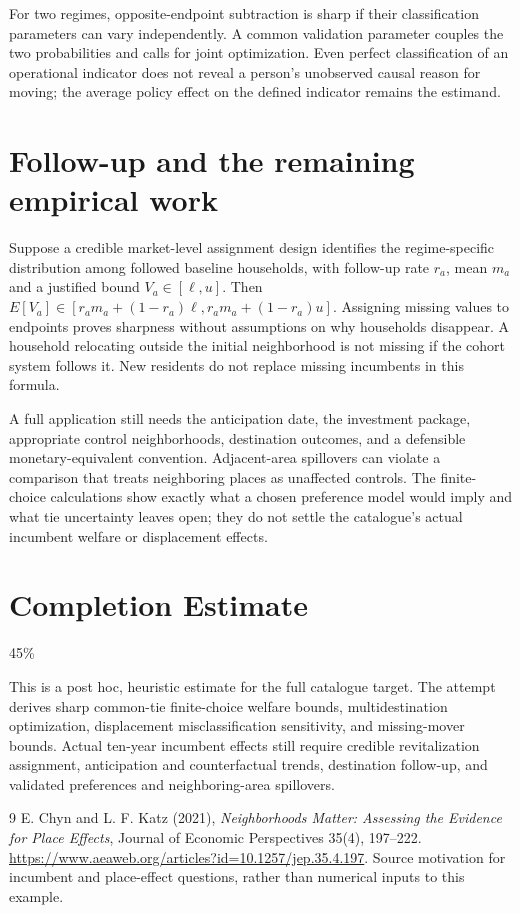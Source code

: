\documentclass[11pt,a4paper]{article}
\begin{document}
For two regimes, opposite-endpoint subtraction is sharp if their classification parameters can vary independently. A common validation parameter couples the two probabilities and calls for joint optimization. Even perfect classification of an operational indicator does not reveal a person's unobserved causal reason for moving; the average policy effect on the defined indicator remains the estimand.

\section{Follow-up and the remaining empirical work}
Suppose a credible market-level assignment design identifies the regime-specific distribution among followed baseline households, with follow-up rate $r_a$, mean $m_a$ and a justified bound $V_a\in[\ell,u]$. Then
$E[V_a]\in[r_am_a+(1-r_a)\ell,r_am_a+(1-r_a)u]$. Assigning missing values to endpoints proves sharpness without assumptions on why households disappear. A household relocating outside the initial neighborhood is not missing if the cohort system follows it. New residents do not replace missing incumbents in this formula.

A full application still needs the anticipation date, the investment package, appropriate control neighborhoods, destination outcomes, and a defensible monetary-equivalent convention. Adjacent-area spillovers can violate a comparison that treats neighboring places as unaffected controls. The finite-choice calculations show exactly what a chosen preference model would imply and what tie uncertainty leaves open; they do not settle the catalogue's actual incumbent welfare or displacement effects.

\section{Completion Estimate}
45\%

This is a post hoc, heuristic estimate for the full catalogue target.
The attempt derives sharp common-tie finite-choice welfare bounds, multidestination optimization, displacement misclassification sensitivity, and missing-mover bounds. Actual ten-year incumbent effects still require credible revitalization assignment, anticipation and counterfactual trends, destination follow-up, and validated preferences and neighboring-area spillovers.

\begin{thebibliography}{9}
 E. Chyn and L. F. Katz (2021), \emph{Neighborhoods Matter: Assessing the Evidence for Place Effects}, Journal of Economic Perspectives 35(4), 197--222. \url{https://www.aeaweb.org/articles?id=10.1257/jep.35.4.197}. Source motivation for incumbent and place-effect questions, rather than numerical inputs to this example.
\end{thebibliography}
\end{document}
